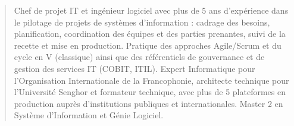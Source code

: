 \documentclass[10pt,a4paper,ragged2e,withhyper]{altacv}
\begin{document}

    
    \makecvheader

    \begin{quote}
    \normalsize Chef de projet IT et ingénieur logiciel avec plus de 5 ans d'expérience dans le pilotage de projets de systèmes d'information : cadrage des besoins, planification, coordination des équipes et des parties prenantes, suivi de la recette et mise en production. Pratique des approches Agile/Scrum et du cycle en V (classique) ainsi que des référentiels de gouvernance et de gestion des services IT (COBIT, ITIL). Expert Informatique pour l'Organisation Internationale de la Francophonie, architecte technique pour l'Université Senghor et formateur technique, avec plus de 5 plateformes en production auprès d'institutions publiques et internationales. Master 2 en Système d'Information et Génie Logiciel.
    \end{quote}
    \vspace{-0.5em}
\end{document}

